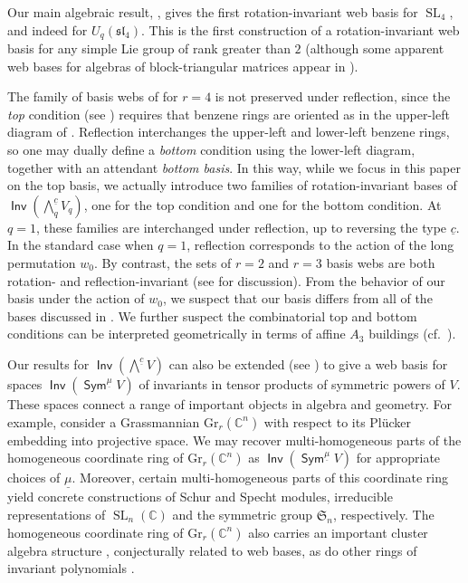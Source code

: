 \documentclass{amsart}
\theoremstyle{definition}
\theoremstyle{remark}
\numberwithin{equation}{section}
\DeclareMathOperator{\SL}{SL}
\newcommand{\fsl}{\mathfrak{sl}}
\DeclareMathOperator{\Inv}{\mathsf{Inv}}
\DeclareMathOperator{\Sym}{\mathsf{Sym}}
\begin{document}
Our main algebraic result, , gives the first rotation-invariant web basis for $\SL_4$, and indeed for $U_q(\fsl_4)$. This is the first construction of a rotation-invariant web basis for any simple Lie group of rank greater than $2$ (although some apparent web bases for algebras of block-triangular matrices appear in \cite{Patrias-Pechenik-Striker}).


The family of basis webs of  for $r=4$ is not preserved under reflection, since the \emph{top} condition (see ) requires that benzene rings are oriented as in the upper-left diagram of . Reflection interchanges the upper-left and lower-left benzene rings, so one may dually define a \emph{bottom} condition using the lower-left diagram, together with an attendant \emph{bottom basis}. In this way, while we focus in this paper on the top basis, we actually introduce two families of rotation-invariant bases of $\Inv(\bigwedge\nolimits_q^{\underline{c}} V_q)$, one for the top condition and one for the bottom condition. At $q=1$, these families are interchanged under reflection, up to reversing the type $\underline{c}$. In the standard case when $q=1$, reflection corresponds to the action of the long permutation $w_0$. By contrast, the sets of $r=2$ and $r=3$ basis webs are both rotation- and reflection-invariant (see \cite{Patrias-Pechenik} for discussion). From the behavior of our basis under the action of $w_0$, we suspect that our basis differs from all of the bases discussed in . We further suspect the combinatorial top and bottom conditions can be interpreted geometrically in terms of affine $A_3$ buildings (cf.\ \cite{Fontaine-Kamnitzer-Kuperberg}).

Our results for $\Inv(\bigwedge^{\underline{c}} V)$ can also be extended (see ) to give a web basis for spaces $\Inv(\Sym^{\underline{\mu}} V)$ of invariants in tensor products of symmetric powers of $V$. These spaces connect a range of important objects in algebra and geometry. For example, consider a Grassmannian $\mathrm{Gr}_r(\mathbb{C}^n)$ with respect to its Pl\"ucker embedding into projective space. We may recover multi-homogeneous parts of the homogeneous coordinate ring of $\mathrm{Gr}_r(\mathbb{C}^n)$ as $\Inv(\Sym^{\underline{\mu}} V)$ for appropriate choices of $\underline{\mu}$. Moreover, certain multi-homogeneous parts of this coordinate ring yield concrete constructions of Schur and Specht modules, irreducible representations of $\SL_n(\mathbb{C})$ and the symmetric group $\mathfrak{S}_n$, respectively. The homogeneous coordinate ring of $\mathrm{Gr}_r(\mathbb{C}^n)$ also carries an important cluster algebra structure \cite{Fomin.Zelevinsky:cluster2}, conjecturally related to web bases, as do other rings of invariant polynomials \cite{Fomin-Pylyavskyy-advances}.
 
\end{document}
